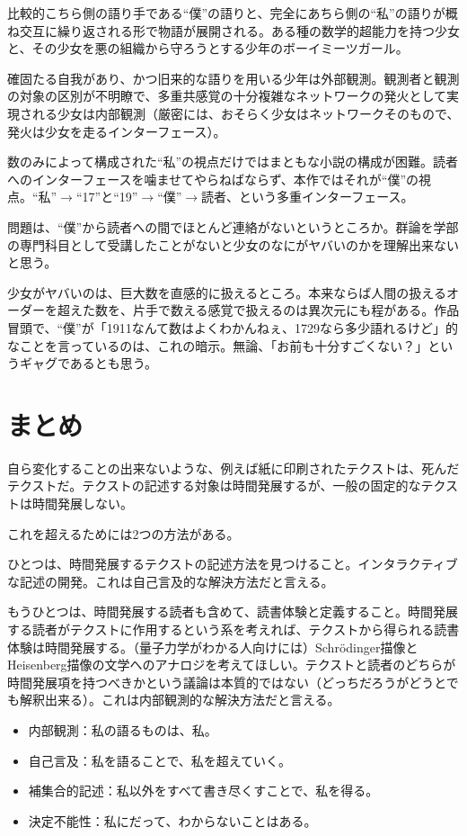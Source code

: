 \documentclass[10pt, a5paper, twoside]{jsarticle}
\begin{document}
			比較的こちら側の語り手である“僕”の語りと、完全にあちら側の“私”の語りが概ね交互に繰り返される形で物語が展開される。ある種の数学的超能力を持つ少女と、その少女を悪の組織から守ろうとする少年のボーイミーツガール。

			確固たる自我があり、かつ旧来的な語りを用いる少年は外部観測。観測者と観測の対象の区別が不明瞭で、多重共感覚の十分複雑なネットワークの発火として実現される少女は内部観測（厳密には、おそらく少女はネットワークそのもので、発火は少女を走るインターフェース）。

			数のみによって構成された“私”の視点だけではまともな小説の構成が困難。読者へのインターフェースを噛ませてやらねばならず、本作ではそれが“僕”の視点。“私”$ \rightarrow $“17”と“19”$ \rightarrow $“僕”$ \rightarrow $読者、という多重インターフェース。

			問題は、“僕”から読者への間でほとんど連絡がないというところか。群論を学部の専門科目として受講したことがないと少女のなにがヤバいのかを理解出来ないと思う。

			少女がヤバいのは、巨大数を直感的に扱えるところ。本来ならば人間の扱えるオーダーを超えた数を、片手で数える感覚で扱えるのは異次元にも程がある。作品冒頭で、“僕”が「1911なんて数はよくわかんねぇ、1729なら多少語れるけど」的なことを言っているのは、これの暗示。無論、「お前も十分すごくない？」というギャグであるとも思う。

	\section{まとめ}

		自ら変化することの出来ないような、例えば紙に印刷されたテクストは、死んだテクストだ。テクストの記述する対象は時間発展するが、一般の固定的なテクストは時間発展しない。

		これを超えるためには2つの方法がある。

		ひとつは、時間発展するテクストの記述方法を見つけること。インタラクティブな記述の開発。これは自己言及的な解決方法だと言える。

		もうひとつは、時間発展する読者も含めて、読書体験と定義すること。時間発展する読者がテクストに作用するという系を考えれば、テクストから得られる読書体験は時間発展する。（量子力学がわかる人向けには）Schrödinger描像とHeisenberg描像の文学へのアナロジを考えてほしい。テクストと読者のどちらが時間発展項を持つべきかという議論は本質的ではない（どっちだろうがどうとでも解釈出来る）。これは内部観測的な解決方法だと言える。

		\begin{itemize}
		
			\item 内部観測：私の語るものは、私。
		
			\item 自己言及：私を語ることで、私を超えていく。
		
			\item 補集合的記述：私以外をすべて書き尽くすことで、私を得る。
		
			\item 決定不能性：私にだって、わからないことはある。

		\end{itemize}
\end{document}
